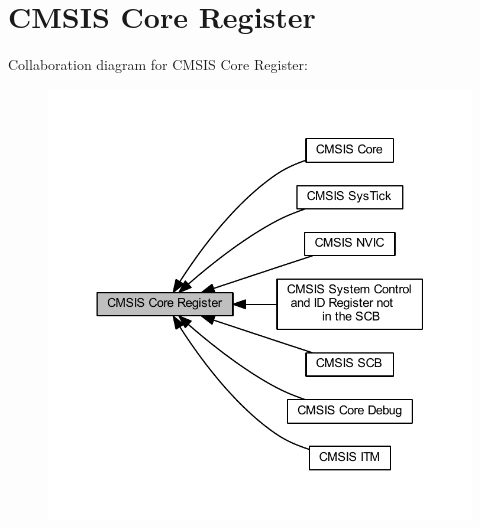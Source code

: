 \hypertarget{group___c_m_s_i_s__core__register}{}\section{C\+M\+S\+IS Core Register}
\label{group___c_m_s_i_s__core__register}
Collaboration diagram for C\+M\+S\+IS Core Register\+:\nopagebreak
\begin{figure}[H]
\begin{center}
\leavevmode
\includegraphics[width=344pt]{group___c_m_s_i_s__core__register}
\end{center}
\end{figure}
